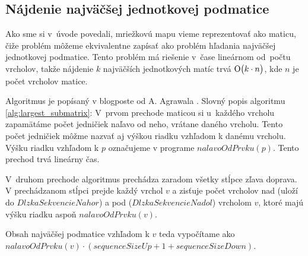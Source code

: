 \subsection{Nájdenie najväčšej jednotkovej podmatice}
Ako sme si v~úvode povedali, mriežkovú mapu vieme reprezentovať ako maticu, čiže
problém môžeme ekvivalentne zapísať ako problém hľadania najväčšej jednotkovej podmatice.
Tento problém má riešenie v~čase lineárnom od~počtu vrcholov, takže nájdenie $k$ najväčších
jednotkových matíc trvá $\operatorname{O}\bigl(k \cdot n\bigr)$, kde $n$ je počet vrcholov matice.

Algoritmus je popísaný v blogposte od A. Agrawala \cite{agrawal_largest_submatrix}.
Slovný popis algoritmu \ref{alg:largest_submatrix}: 
V~prvom prechode maticou si u~každého vrcholu zapamätáme počet jedničiek naľavo od neho, vrátane daného vrcholu.  
Tento počet jedničiek môžme nazvať aj výškou riadku vzhľadom k danému vrcholu. Výšku riadku vzhľadom k $p$ označujeme v programe $nalavoOdPrvku(p)$.
Tento prechod trvá lineárny čas. 

V~druhom prechode algoritmus prechádza zaradom všetky stĺpce zľava doprava. V prechádzanom stĺpci prejde každý vrchol $v$ a zisťuje počet vrcholov nad (uloží do $DlzkaSekvencieNahor$) a pod ($DlzkaSekvencieNadol$) vrcholom $v$, ktoré majú výšku riadku aspoň $nalavoOdPrvku(v)$. 

Obsah najväčšej podmatice vzhľadom k $v$ teda vypočítame ako\\
$ nalavoOdPrvku(v) \cdot (sequenceSizeUp + 1 + sequenceSizeDown)$.




